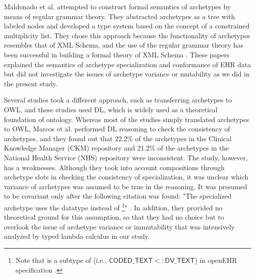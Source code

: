 \documentclass[preprint,3p,onecolumn,times,review]{article}
\begin{document}
{Maldonado et al. \cite{jose09:_linkeh_ed,maldonado07:_framew_for_clinic_data_stand_based_archet} attempted to construct formal semantics of archetypes by means of regular grammar theory.  They abstracted archetypes as a tree with labeled nodes and developed a type system based on the concept of a constrained multiplicity list. They chose this approach because the functionality of archetypes resembles that of XML Schema, and the use of the regular grammar theory has been successful in building a formal theory of XML Schema \cite{chidlovskii00:_using_regul_tree_autom_xml,murata05:_taxon_of_xml_schem_languag}. These papers explained the semantics of archetype specialization and conformance of EHR data but did not investigate the issues of archetype variance or mutability as we did in the present study.

Several studies took a different approach, such as transferring archetypes to OWL, and these studies used DL, which is widely used as a theoretical foundation of ontology. 
Whereas most of the studies \cite{martinez-costa08:_model_driven_approac_for_repres,maldonado12:_using_resear_ehr,lezcano11:_integ_owl_swrl,martinez-costa10:_iso_en_openeh,costa12:_towar} simply translated archetypes to OWL, Marcos et al. \cite{menarguez-tortosa13:_owl} performed DL reasoning to check the consistency of archetypes, and they found out that  22.2\% of the archetypes in the Clinical Knowledge Manager (CKM) repository and 21.2\% of the archetypes in the National Health Service (NHS) repository were inconsistent. 
The study, however, has a weaknesses.
Although they took into account compositions through archetype slots in checking the consistency of specialization, it was unclear which variance of archetypes was assumed to be true in the reasoning.
It was presumed to be covariant only after the following citation was found: "The specialized archetype uses the datatype {} instead of {}\footnote{Note that {} is a subtype of {} (i.e., $\mathsf{CODED\_TEXT} <: \mathsf{DV\_TEXT}$) in openEHR specification \cite[p.21]{beale08:_refer_model_data_types_infor_model}.}" \cite[p.312]{menarguez-tortosa13:_owl}.
In addition, they provided no theoretical ground for this assumption, so that they had no choice but to overlook the issue of archetype variance or immutability that was intensively analyzed by typed lambda calculus in our study.

}
\end{document}
